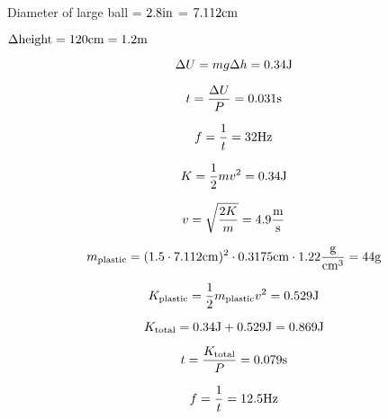 Diameter of large ball = $2.8\rm{in}$ = $7.112\rm{cm}$

$\Delta \rm{height} = 120\rm{cm} = 1.2\rm{m}$

\[\Delta U = m g \Delta h = 0.34\rm{J}\]

\[t = \frac{\Delta U}{P} = 0.031\rm{s}\]

\[f = \frac{1}{t} = 32\rm{Hz}\]

\[K = \frac{1}{2} m v^2 = 0.34\rm{J}\]

\[v = \sqrt{\frac{2 K}{m}} = 4.9\frac{\rm{m}}{\rm{s}}\]

\[m_{\rm{plastic}} = (1.5 \cdot 7.112\rm{cm})^2 \cdot 0.3175\rm{cm} \cdot 1.22\frac{\rm{g}}{\rm{cm}^3}
 = 44\rm{g}
\]

\[K_{\rm{plastic}} = \frac{1}{2} m_{\rm{plastic}} v^2 = 0.529\rm{J}\]

\[K_{\rm{total}} = 0.34\rm{J} + 0.529\rm{J} = 0.869\rm{J}\]

\[t = \frac{K_{\rm{total}}}{P} = 0.079\rm{s}\]

\[f = \frac{1}{t} = 12.5\rm{Hz}\]
